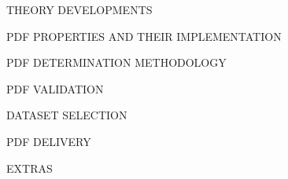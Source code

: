 \documentclass[a4,landscape]{seminar}
\newcommand{\1}{1\!\!\!1}
\begin{document}
\begin{slide}\begin{center}
  \huge\blue THEORY DEVELOPMENTS
\end{center}\end{slide}
\begin{slide}\begin{center}
  \huge\blue PDF PROPERTIES AND THEIR IMPLEMENTATION
\end{center}\end{slide}
\begin{slide}\begin{center}
  \huge\blue PDF DETERMINATION METHODOLOGY
\end{center}\end{slide}
\begin{slide}\begin{center}
  \huge\blue PDF VALIDATION
\end{center}\end{slide}
\begin{slide}\begin{center}
  \huge\blue DATASET SELECTION
\end{center}\end{slide}
\begin{slide}\begin{center}
  \huge\blue PDF DELIVERY
\end{center}\end{slide}
\begin{slide}\begin{center}
  \huge\blue EXTRAS
\end{center}\end{slide}
\end{document}
